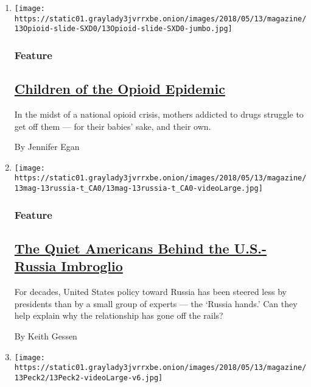 \begin{enumerate}
\def\labelenumi{\arabic{enumi}.}
\item
  \texttt{[image: https://static01.graylady3jvrrxbe.onion/images/2018/05/13/magazine/13Opioid-slide-SXD0/13Opioid-slide-SXD0-jumbo.jpg]}

  \hypertarget{feature}{%
  \subsubsection{Feature}\label{feature}}

  \hypertarget{children-of-the-opioid-epidemic}{%
  \subsection{\texorpdfstring{\href{/2018/05/09/magazine/children-of-the-opioid-epidemic.html}{Children
  of the Opioid
  Epidemic}}{Children of the Opioid Epidemic}}\label{children-of-the-opioid-epidemic}}

  In the midst of a national opioid crisis, mothers addicted to drugs
  struggle to get off them --- for their babies' sake, and their own.

  By Jennifer Egan
\item
  \texttt{[image: https://static01.graylady3jvrrxbe.onion/images/2018/05/13/magazine/13mag-13russia-t\_CA0/13mag-13russia-t\_CA0-videoLarge.jpg]}

  \hypertarget{feature-1}{%
  \subsubsection{Feature}\label{feature-1}}

  \hypertarget{the-quiet-americans-behind-the-us-russia-imbroglio}{%
  \subsection{\texorpdfstring{\href{/2018/05/08/magazine/the-quiet-americans-behind-the-us-russia-imbroglio.html}{The
  Quiet Americans Behind the U.S.-Russia
  Imbroglio}}{The Quiet Americans Behind the U.S.-Russia Imbroglio}}\label{the-quiet-americans-behind-the-us-russia-imbroglio}}

  For decades, United States policy toward Russia has been steered less
  by presidents than by a small group of experts --- the `Russia hands.'
  Can they help explain why the relationship has gone off the rails?

  By Keith Gessen
\item
  \texttt{[image: https://static01.graylady3jvrrxbe.onion/images/2018/05/13/magazine/13Peck2/13Peck2-videoLarge-v6.jpg]}


\end{enumerate}
